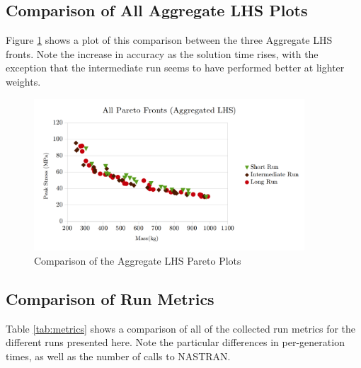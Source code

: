 \subsection{Comparison of All Aggregate LHS Plots}
Figure \ref{fig:pfront_comp_agg} shows a plot of this comparison between the three Aggregate LHS fronts. Note the increase in accuracy as the solution time rises, with the exception that the intermediate run seems to have performed better at lighter weights. 

\begin{figure}[!htbp]
\includegraphics[width=0.9\textwidth]{img/pf_comp_agg.png}
\caption{Comparison of the Aggregate LHS Pareto Plots}
\label{fig:pfront_comp_agg}
\end{figure}

\subsection{Comparison of Run Metrics}
Table \ref{tab:metrics} shows a comparison of all of the collected run metrics for the different runs presented here. Note the particular differences in per-generation times, as well as the number of calls to NASTRAN. 



